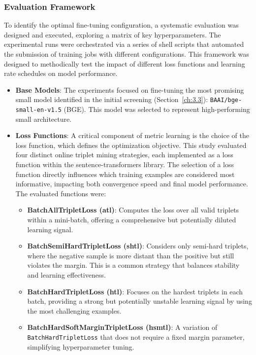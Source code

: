 \subsubsection{Evaluation Framework}
To identify the optimal fine-tuning configuration, a systematic evaluation was designed and executed, exploring a matrix of key hyperparameters. The experimental runs were orchestrated via a series of shell scripts that automated the submission of training jobs with different configurations. This framework was designed to methodically test the impact of different loss functions and learning rate schedules on model performance.
\begin{itemize}
    \item \textbf{Base Models}: The experiments focused on fine-tuning the most promising small model identified in the initial screening (Section~\ref{ch:3.3}): \verb|BAAI/bge-small-en-v1.5| (BGE). This model was selected to represent high-performing small architecture.{\setlength{\emergencystretch}{5em}\par}
    \item \textbf{Loss Functions}: A critical component of metric learning is the choice of the loss function, which defines the optimization objective. This study evaluated four distinct online triplet mining strategies, each implemented as a loss function within the sentence-transformers library. The selection of a loss function directly influences which training examples are considered most informative, impacting both convergence speed and final model performance. The evaluated functions were:
          \begin{itemize}
              \item \textbf{BatchAllTripletLoss (atl)}: Computes the loss over all valid triplets within a mini-batch, offering a comprehensive but potentially diluted learning signal.
              \item \textbf{BatchSemiHardTripletLoss (shtl)}: Considers only semi-hard triplets, where the negative sample is more distant than the positive but still violates the margin. This is a common strategy that balances stability and learning effectiveness.
              \item \textbf{BatchHardTripletLoss (htl)}: Focuses on the hardest triplets in each batch, providing a strong but potentially unstable learning signal by using the most challenging examples.
              \item \textbf{BatchHardSoftMarginTripletLoss (hsmtl)}: A variation of \verb|BatchHardTripletLoss| that does not require a fixed margin parameter, simplifying hyperparameter tuning.{\setlength{\emergencystretch}{6em}\par}

\end{itemize}
\end{itemize}
